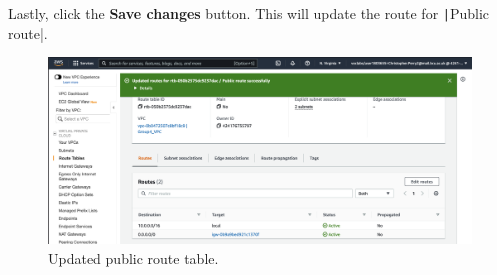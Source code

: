 Lastly, click the \textbf{Save changes} button.
This will update the route for \texttt|Public route|.

\begin{figure}[!htbp]
    \centering
    \includegraphics[width=\textwidth]{resources/vpc/routes/vpc-public-route-after}
    \caption{Updated public route table.}
    \label{fig:vpc-public-route-after}
\end{figure}
